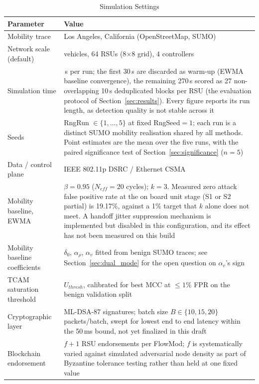 \documentclass[final,5p,twocolumn]{elsarticle}
\theoremstyle{remark}
\theoremstyle{plain}
\begin{document}
\begin{table}[!t]
	\centering
	\caption{Simulation Settings}
	\label{tab:phantom_sim_settings}
	\renewcommand{\arraystretch}{1.2}
	\footnotesize
	\begin{tabular}{|>{\raggedright\arraybackslash}p{3.2cm}|>{\raggedright\arraybackslash}p{4.4cm}|}
		\hline
		\textbf{Parameter} & \textbf{Value} \\
		\hline
		Mobility trace & Los Angeles, California (OpenStreetMap, SUMO) \\
		\hline
		Network scale (default) & 200 vehicles, 64 RSUs (8$\times$8 grid), 4 controllers \\
		\hline
		Simulation time & 300\,s per run; the first 30\,s are discarded as warm-up (EWMA baseline convergence), the remaining 270\,s scored as 27 non-overlapping 10\,s deduplicated blocks per RSU (the evaluation protocol of Section~\ref{sec:results}). Every figure reports its run length, as detection quality is not stable across it \\
		\hline
		Seeds & RngRun $\in\{1,\dots,5\}$ at fixed RngSeed${=}1$; each run is a distinct SUMO mobility realisation shared by all methods. Point estimates are the mean over the five runs, with the paired significance test of Section~\ref{sec:significance} ($n{=}5$) \\
		\hline
		Data / control plane & IEEE 802.11p DSRC / Ethernet CSMA \\
		\hline
		Mobility baseline, EWMA & $\beta = 0.95$ ($N_{eff}{=}20$ cycles); $k = 3$. Measured zero attack false positive rate at the on board unit stage (S1 or S2 partial) is 19.17\%, against a 1\% target that $k$ alone does not meet. A handoff jitter suppression mechanism is implemented but disabled in this configuration, and its effect has not been measured on this build \\
		\hline
		Mobility baseline coefficients & $\delta_0$, $\alpha_\rho$, $\alpha_v$ fitted from benign SUMO traces; see Section~\ref{sec:dual_mode} for the open question on $\alpha_v$'s sign \\
		\hline
		TCAM saturation threshold & $U_{thresh}$, calibrated for best MCC at $\leq 1\%$ FPR on the benign validation split \\
		\hline
		Cryptographic layer & ML-DSA-87 signatures; batch size $B \in \{10, 15, 20\}$ packets/batch, swept for lowest end to end latency within the 50\,ms bound, not yet finalized in this draft \\
		\hline
		Blockchain endorsement & $f{+}1$ RSU endorsements per FlowMod; $f$ is systematically varied against simulated adversarial node density as part of Byzantine tolerance testing rather than held at one fixed value \\

\end{tabular}
\end{table}
\end{document}
